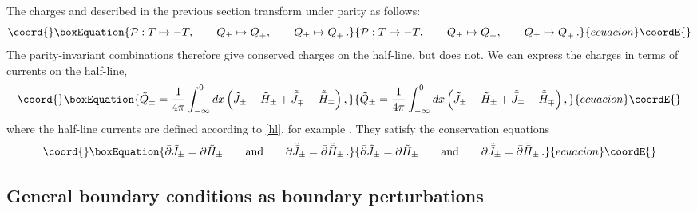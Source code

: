 \documentclass[a4paper,12pt]{article}
\numberwithin{equation}{section}
\begin{document}
The charges  \coordHE{} and \coordHE{} described in the
previous section transform under parity \coordHE{} as follows:
\begin{equation}\coord{}\boxEquation{ {\cal P} : T \mapsto -T, \qquad Q_\pm \mapsto
\bar{Q}_\mp , \qquad \bar{Q}_\pm \mapsto Q_\mp\,.}{ {\cal P} : T \mapsto -T, \qquad Q_\pm \mapsto
\bar{Q}_\mp , \qquad \bar{Q}_\pm \mapsto Q_\mp\,.}{ecuacion}\coordE{}\end{equation}
The parity-invariant combinations \coordHE{} therefore give conserved charges on the half-line,
but \coordHE{} does not. We can express the charges \coordHE{} in
terms of currents on the half-line,
\begin{equation}\coord{}\boxEquation{\label{qce}
\tilde{Q}_\pm = {1\over 4\pi} \int_{-\infty}^0 dx\left(
\tilde{J}_\pm - \tilde{H}_\pm +\tilde{\bar{J}}_\mp -
\tilde{\bar{H}}_\mp\right),
}{\tilde{Q}_\pm = {1\over 4\pi} \int_{-\infty}^0 dx\left(
\tilde{J}_\pm - \tilde{H}_\pm +\tilde{\bar{J}}_\mp -
\tilde{\bar{H}}_\mp\right),
}{ecuacion}\coordE{}\end{equation}
where the half-line currents are defined according to \eqref{hl},
for example \coordHE{}. They
satisfy the conservation equations \begin{equation}\coord{}\boxEquation{
\bar{\partial}\tilde{J}_\pm =
\partial \tilde{H}_\pm \qquad {\rm and} \qquad \partial \tilde{\bar{J}}_\pm =
\bar{\partial}\tilde{\bar{H}}_\pm\,.}{
\bar{\partial}\tilde{J}_\pm =
\partial \tilde{H}_\pm \qquad {\rm and} \qquad \partial \tilde{\bar{J}}_\pm =
\bar{\partial}\tilde{\bar{H}}_\pm\,.}{ecuacion}\coordE{}\end{equation}




\subsection{General boundary conditions as boundary perturbations\label{sectgbcbp}}
\end{document}
